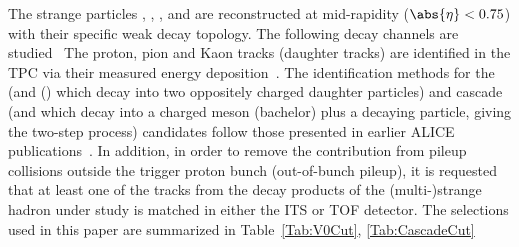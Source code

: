 The strange particles \kzero, \lmb, \almb, \Xis and \Oms are reconstructed at mid-rapidity ($\abs{\eta} < 0.75$) with their specific weak decay topology.
The following decay channels are studied~\cite{PhysRevD.98.030001}
The proton, pion and Kaon tracks (daughter tracks) are identified in the TPC via their measured energy deposition~\cite{Abelev:2014ffa}.
The identification methods for the \Vzero (\kzero and \lmb (\almb) which decay into two oppositely charged daughter particles) and cascade (\Xis and \Oms which decay into a charged meson (bachelor) plus a \Vzero decaying particle, giving the two-step process) candidates follow those presented in earlier ALICE publications~\cite{Aamodt:2011zza, Abelev:2012jp, Acharya:2018orn, Abelev:2013haa, Acharya:2020uxl, Acharya:2019kyh}.
In addition, in order to remove the contribution from pileup collisions outside the trigger proton bunch (out-of-bunch pileup), it is requested that at least one of the tracks from the decay products of the (multi-)strange hadron under study is matched in either the ITS or TOF detector.
The selections used in this paper are summarized in Table~\ref{Tab:V0Cut}, \ref{Tab:CascadeCut}
